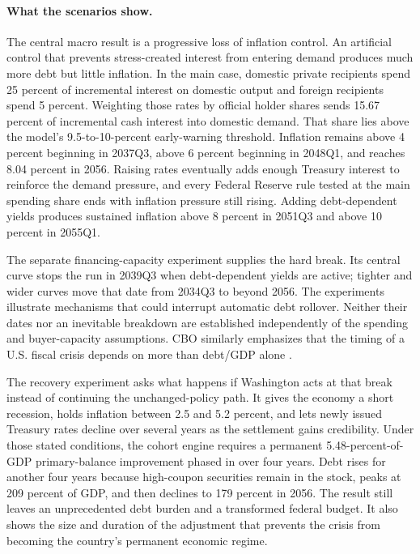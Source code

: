 \documentclass[11pt]{article}
\begin{document}
\paragraph{What the scenarios show.}
The central macro result is a progressive loss of inflation control.  An artificial control that prevents
stress-created interest from entering demand produces much more debt but little inflation.
In the main case, domestic private recipients spend 25 percent of incremental interest on
domestic output and foreign recipients spend 5 percent.  Weighting those rates by official
holder shares sends 15.67 percent of incremental cash interest into domestic demand.  That
share lies above the model's 9.5-to-10-percent early-warning threshold.  Inflation remains
above 4 percent beginning in 2037Q3, above 6 percent beginning in 2048Q1, and reaches 8.04
percent in 2056.  Raising rates eventually adds enough Treasury interest to reinforce the
demand pressure, and every Federal Reserve rule tested at the main spending share ends with
inflation pressure still rising.  Adding debt-dependent yields produces sustained inflation
above 8 percent in 2051Q3 and above 10 percent in 2055Q1.

The separate financing-capacity experiment supplies the hard break.  Its central curve stops
the run in 2039Q3 when debt-dependent yields are active; tighter and wider curves
move that date from 2034Q3 to beyond 2056.  The experiments illustrate mechanisms
that could interrupt automatic debt rollover. Neither their dates nor an inevitable
breakdown are established independently of the spending and buyer-capacity assumptions.  CBO similarly emphasizes
that the timing of a U.S. fiscal crisis depends on more than debt/GDP alone \cite{cboCrisis}.

The recovery experiment asks what happens if Washington acts at that break instead of
continuing the unchanged-policy path.  It gives the economy a short recession, holds
inflation between 2.5 and 5.2 percent, and lets newly issued Treasury rates decline over
several years as the settlement gains credibility.  Under those stated conditions, the
cohort engine requires a permanent 5.48-percent-of-GDP primary-balance improvement phased in
over four years.  Debt rises for another four years because high-coupon securities remain in
the stock, peaks at 209 percent of GDP, and then declines to 179 percent in 2056.  The result
still leaves an unprecedented debt burden and a transformed federal budget.  It also shows
the size and duration of the adjustment that prevents the crisis from becoming the country's
permanent economic regime.
\end{document}
